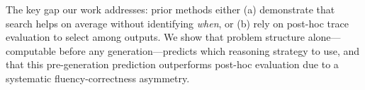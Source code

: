 The key gap our work addresses: prior methods either (a) demonstrate that search helps on average without identifying \emph{when}, or (b) rely on post-hoc trace evaluation to select among outputs. We show that problem structure alone---computable before any generation---predicts which reasoning strategy to use, and that this pre-generation prediction outperforms post-hoc evaluation due to a systematic fluency-correctness asymmetry.
